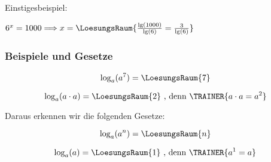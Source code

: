 Einstigesbeispiel:

 $6^x = 1000 \Longrightarrow x= \LoesungsRaum{\frac{\lg(1000)}{\lg(6)} = \frac{3}{\lg(6)}}$




\newpage



%



\subsubsection{Beispiele und Gesetze}
 
 \begin{beispiel}{}{}
   $$\log_a(a^7) = \LoesungsRaum{7}$$
\end{beispiel}


\begin{beispiel}{}{}
   $$\log_a(a\cdot{}a) = \LoesungsRaum{2} \text{ , denn } \TRAINER{a\cdot{}a = a^2}$$
\end{beispiel}


Daraus erkennen wir die folgenden Gesetze:

\begin{gesetz}{}{}
  $$\log_a(a^n) = \LoesungsRaum{n}$$
\end{gesetz}

 \begin{gesetz}{}{}
   $$\log_a(a) = \LoesungsRaum{1} \text{ , denn } \TRAINER{a^1 = a}$$
\end{gesetz}

